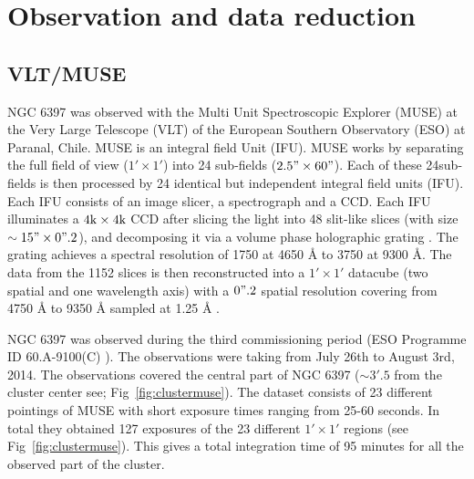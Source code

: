 \chapter{Observation and data reduction}\label{chap:data}
\thispagestyle{fancy}

\section{VLT/MUSE}

NGC 6397 was observed with the Multi Unit Spectroscopic Explorer (MUSE) at the Very Large Telescope (VLT) of the European Southern Observatory (ESO) at Paranal, Chile. MUSE is an integral field Unit (IFU). MUSE works by separating the full field of view ($1' \times 1'$) into 24 sub-fields ($2.5" \times 60"$). Each of these 24sub-fields is then processed by 24 identical but independent integral field units (IFU). Each IFU consists of an image slicer, a spectrograph and a CCD. Each IFU illuminates a $4 \text k \times 4 \text k$ CCD after slicing the light into 48 slit-like slices (with size $\sim 15" \times 0".2$), and decomposing it via a volume phase holographic grating \citep{barden_volume-phase_1998}. The grating achieves a spectral resolution of 1750 at 4650 Å to 3750 at 9300 Å. The data from the 1152 slices is then reconstructed into a $1' \times 1'$ datacube (two spatial and one wavelength axis) with a $0".2$ spatial resolution covering from 4750 Å to 9350 Å sampled at 1.25 Å \citep{bacon_muse_2010}. 

NGC 6397 was observed during the third commissioning period  (ESO Programme ID 60.A-9100(C) \citealp{bacon_muse_2014}). The observations were taking from July 26th to August 3rd, 2014. The observations covered the central part of NGC 6397 ($\sim 3'.5$ from the cluster center see; Fig~\ref{fig:clustermuse}). The dataset consists of 23 different pointings of MUSE with short exposure times ranging from 25-60 seconds. In total they obtained 127 exposures of the 23 different $1' \times 1'$ regions (see Fig~\ref{fig:clustermuse}). This gives a total integration time of 95 minutes for all the observed part of the cluster.


